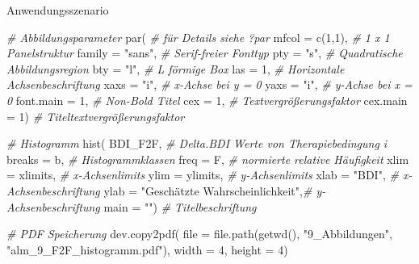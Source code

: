 \documentclass[
  8pt,
  ignorenonframetext,
]{beamer}
\newenvironment{Shaded}{\begin{snugshade}}{\end{snugshade}}
\newcommand{\AttributeTok}[1]{\textcolor[rgb]{0.77,0.63,0.00}{#1}}
\newcommand{\CommentTok}[1]{\textcolor[rgb]{0.56,0.35,0.01}{\textit{#1}}}
\newcommand{\DecValTok}[1]{\textcolor[rgb]{0.00,0.00,0.81}{#1}}
\newcommand{\FunctionTok}[1]{\textcolor[rgb]{0.00,0.00,0.00}{#1}}
\newcommand{\NormalTok}[1]{#1}
\newcommand{\StringTok}[1]{\textcolor[rgb]{0.31,0.60,0.02}{#1}}
\begin{document}
\begin{frame}[fragile]{Anwendungsszenario}
\begin{Shaded}
\begin{Highlighting}[]
\CommentTok{\# Abbildungsparameter}
\FunctionTok{par}\NormalTok{(                                        }\CommentTok{\# für Details siehe ?par}
\AttributeTok{mfcol       =} \FunctionTok{c}\NormalTok{(}\DecValTok{1}\NormalTok{,}\DecValTok{1}\NormalTok{),                       }\CommentTok{\# 1 x 1 Panelstruktur}
\AttributeTok{family      =} \StringTok{"sans"}\NormalTok{,                       }\CommentTok{\# Serif{-}freier Fonttyp}
\AttributeTok{pty         =} \StringTok{"s"}\NormalTok{,                          }\CommentTok{\# Quadratische Abbildungsregion}
\AttributeTok{bty         =} \StringTok{"l"}\NormalTok{,                          }\CommentTok{\# L förmige Box}
\AttributeTok{las         =} \DecValTok{1}\NormalTok{,                            }\CommentTok{\# Horizontale Achsenbeschriftung}
\AttributeTok{xaxs        =} \StringTok{"i"}\NormalTok{,                          }\CommentTok{\# x{-}Achse bei y = 0}
\AttributeTok{yaxs        =} \StringTok{"i"}\NormalTok{,                          }\CommentTok{\# y{-}Achse bei x = 0}
\AttributeTok{font.main   =} \DecValTok{1}\NormalTok{,                            }\CommentTok{\# Non{-}Bold Titel}
\AttributeTok{cex         =} \DecValTok{1}\NormalTok{,                            }\CommentTok{\# Textvergrößerungsfaktor}
\AttributeTok{cex.main    =} \DecValTok{1}\NormalTok{)                            }\CommentTok{\# Titeltextvergrößerungsfaktor}

\CommentTok{\# Histogramm}
\FunctionTok{hist}\NormalTok{(}
\NormalTok{BDI\_F2F,                                    }\CommentTok{\# Delta.BDI Werte von Therapiebedingung i}
\AttributeTok{breaks    =}\NormalTok{ b,                              }\CommentTok{\# Histogrammklassen}
\AttributeTok{freq      =}\NormalTok{ F,                              }\CommentTok{\# normierte relative Häufigkeit}
\AttributeTok{xlim      =}\NormalTok{ xlimits,                        }\CommentTok{\# x{-}Achsenlimits}
\AttributeTok{ylim      =}\NormalTok{ ylimits,                        }\CommentTok{\# y{-}Achsenlimits}
\AttributeTok{xlab      =} \StringTok{"BDI"}\NormalTok{,                          }\CommentTok{\# x{-}Achsenbeschriftung}
\AttributeTok{ylab      =} \StringTok{"Geschätzte Wahrscheinlichkeit"}\NormalTok{,}\CommentTok{\# y{-}Achsenbeschriftung}
\AttributeTok{main      =} \StringTok{""}\NormalTok{)                             }\CommentTok{\# Titelbeschriftung}

\CommentTok{\# PDF Speicherung}
\FunctionTok{dev.copy2pdf}\NormalTok{(}
\AttributeTok{file        =} \FunctionTok{file.path}\NormalTok{(}\FunctionTok{getwd}\NormalTok{(), }\StringTok{"9\_Abbildungen"}\NormalTok{, }\StringTok{"alm\_9\_F2F\_histogramm.pdf"}\NormalTok{),}
\AttributeTok{width       =} \DecValTok{4}\NormalTok{,}
\AttributeTok{height      =} \DecValTok{4}\NormalTok{)}
\end{Highlighting}
\end{Shaded}
\end{frame}
\end{document}
